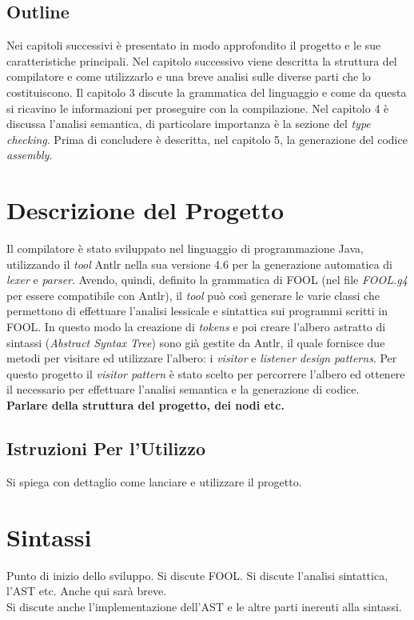 \documentclass{scrreprt}
\begin{document}
\section{Outline}
Nei capitoli successivi è presentato in modo approfondito il progetto e le sue caratteristiche principali. Nel capitolo successivo viene descritta la struttura del compilatore e come utilizzarlo e una breve analisi sulle diverse parti che lo costituiscono. Il capitolo 3 discute la grammatica del linguaggio e come da questa si ricavino le informazioni per proseguire con la compilazione. Nel capitolo 4 è discussa l'analisi semantica, di particolare importanza è la sezione del \textit{type checking}. Prima di concludere è descritta, nel capitolo 5, la generazione del codice \textit{assembly}.

\chapter{Descrizione del Progetto}
Il compilatore è stato sviluppato nel linguaggio di programmazione Java, utilizzando il \textit{tool} Antlr nella sua versione 4.6 per la generazione automatica di \textit{lexer} e \textit{parser}. Avendo, quindi, definito la grammatica di FOOL (nel file \textit{FOOL.g4} per essere compatibile con Antlr), il \textit{tool} può così generare le varie classi che permettono di effettuare l'analisi lessicale e sintattica sui programmi scritti in FOOL. In questo modo la creazione di \textit{tokens} e poi creare l'albero astratto di sintassi (\textit{Abstract Syntax Tree}) sono già gestite da Antlr, il quale fornisce due metodi per visitare ed utilizzare l'albero: i \textit{visitor} e \textit{listener design patterns}. Per questo progetto il \textit{visitor pattern} è stato scelto per percorrere l'albero ed ottenere il necessario per effettuare l'analisi semantica e la generazione di codice.\\

\textbf{Parlare della struttura del progetto, dei nodi etc.}

\section{Istruzioni Per l'Utilizzo}
Si spiega con dettaglio come lanciare e utilizzare il progetto.

\chapter{Sintassi}
Punto di inizio dello sviluppo. Si discute FOOL.
Si discute l'analisi sintattica, l'AST etc. Anche qui sarà breve.\\
Si discute anche l'implementazione dell'AST e le altre parti inerenti alla sintassi.
\end{document}
